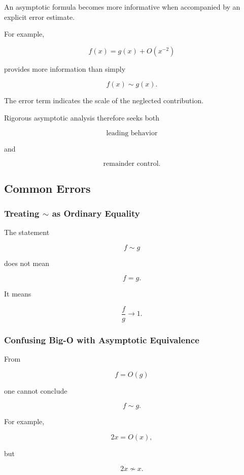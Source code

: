 An asymptotic formula becomes more informative when accompanied by an
explicit error estimate.

For example,

\[
\boxed{
f(x)
=
g(x)
+
O(x^{-2})
}
\]

provides more information than simply

\[
f(x)\sim g(x).
\]

The error term indicates the scale of the neglected contribution.

Rigorous asymptotic analysis therefore seeks both

\[
\boxed{
\text{leading behavior}
}
\]

and

\[
\boxed{
\text{remainder control}.
}
\]

\subsection{Common Errors}
\label{subsec:asymptotic-analysis-common-errors}

\subsubsection{Treating \(\sim\) as Ordinary Equality}

The statement

\[
f\sim g
\]

does not mean

\[
f=g.
\]

It means

\[
\boxed{
\frac fg\to1.
}
\]

\subsubsection{Confusing Big-O with Asymptotic Equivalence}

From

\[
f=O(g)
\]

one cannot conclude

\[
f\sim g.
\]

For example,

\[
2x=O(x),
\]

but

\[
2x\not\sim x.
\]

